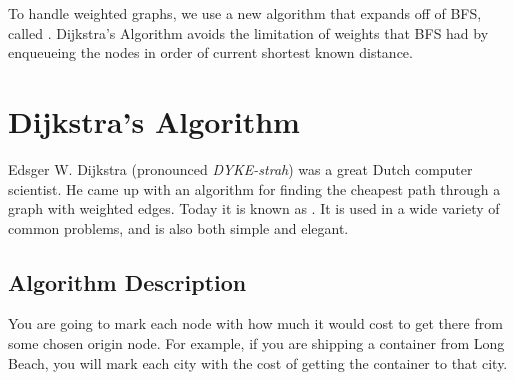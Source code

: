 To handle weighted graphs, we use a new algorithm that expands off of BFS, called . Dijkstra's Algorithm avoids the limitation of weights that BFS had by enqueueing the nodes in order of current shortest known distance.

\section{Dijkstra's Algorithm}

Edsger W. Dijkstra (pronounced \textit{DYKE-strah}) was a great Dutch computer scientist. He came up
with an algorithm for finding the cheapest path through a graph with
weighted edges. Today it is known as . It is used in a wide variety of common problems, and is
also both simple and elegant.

\subsection{Algorithm Description}

You are going to mark each node with how much it would cost to get
there from some chosen origin node.  For example, if you are shipping a
container from Long Beach, you will mark each city with the cost of
getting the container to that city.

